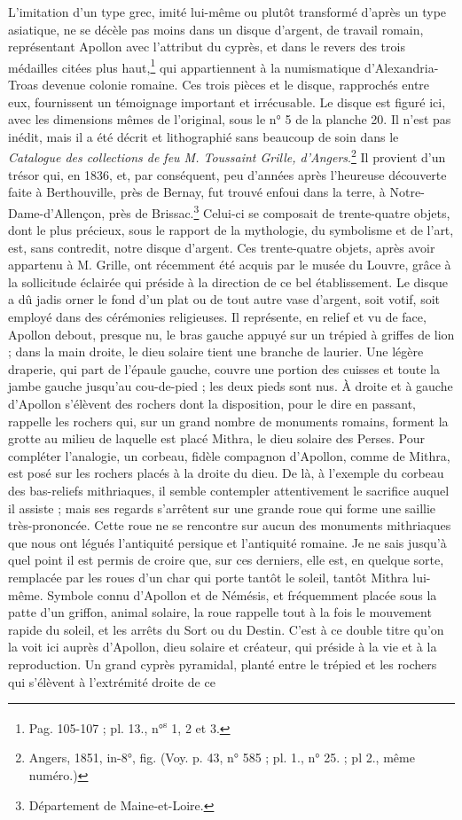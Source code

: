\documentclass{article}
\begin{document}
L'imitation d'un type grec, imité lui-même ou plutôt transformé d'après un type asiatique, ne se décèle pas moins dans un disque d'argent, de travail romain, représentant Apollon avec l'attribut du cyprès, et dans le revers des trois médailles citées plus haut,\footnote{Pag. 105-107 ; pl. 13., n°\textsuperscript{s} 1, 2 et 3.} qui appartiennent à la numismatique d'Alexandria-Troas devenue colonie romaine. Ces trois pièces et le disque, rapprochés entre eux, fournissent un témoignage important et irrécusable. Le disque est figuré ici, avec les dimensions mêmes de l'original, sous le n° 5 de la planche 20. Il n'est pas inédit, mais il a été décrit et lithographié sans beaucoup de soin dans le \emph{Catalogue des collections de feu M. Toussaint Grille, d'Angers}.\footnote{Angers, 1851, in-8°, fig. (Voy. p. 43, n° 585 ; pl. 1., n° 25. ; pl 2., même numéro.)} Il provient d'un trésor qui, en 1836, et, par conséquent, peu d'années après l'heureuse découverte faite à Berthouville, près de Bernay, fut trouvé enfoui dans la terre, à Notre-Dame-d'Allençon, près de Brissac.\footnote{Département de Maine-et-Loire.} Celui-ci se composait de trente-quatre objets, dont le plus précieux, sous le rapport de la mythologie, du symbolisme et de l'art, est, sans contredit, notre disque d'argent. Ces trente-quatre objets, après avoir appartenu à M. Grille, ont récemment été acquis par le musée du Louvre, grâce à la sollicitude éclairée qui préside à la direction de ce bel établissement. Le disque a dû jadis orner le fond d'un plat ou de tout autre vase d'argent, soit votif, soit employé dans des cérémonies religieuses. Il représente, en relief et vu de face, Apollon debout, presque nu, le bras gauche appuyé sur un trépied à griffes de lion ; dans la main droite, le dieu solaire tient une branche de laurier. Une légère draperie, qui part de l'épaule gauche, couvre une portion des cuisses et toute la jambe gauche jusqu'au cou-de-pied ; les deux pieds sont nus. À droite et à gauche d'Apollon s'élèvent des rochers dont la disposition, pour le dire en passant, rappelle les rochers qui, sur un grand nombre de monuments romains, forment la grotte au milieu de laquelle est placé Mithra, le dieu solaire des Perses. Pour compléter l'analogie, un corbeau, fidèle compagnon d'Apollon, comme de Mithra, est posé sur les rochers placés à la droite du dieu. De là, à l'exemple du corbeau des bas-reliefs mithriaques, il semble contempler attentivement le sacrifice auquel il assiste ; mais ses regards s'arrêtent sur une grande roue qui forme une saillie très-prononcée. Cette roue ne se rencontre sur aucun des monuments mithriaques que nous ont légués l'antiquité persique et l'antiquité romaine. Je ne sais jusqu'à quel point il est permis de croire que, sur ces derniers, elle est, en quelque sorte, remplacée par les roues d'un char qui porte tantôt le soleil, tantôt Mithra lui-même. Symbole connu d'Apollon et de Némésis, et fréquemment placée sous la patte d'un griffon, animal solaire, la roue rappelle tout à la fois le mouvement rapide du soleil, et les arrêts du Sort ou du Destin. C'est à ce double titre qu'on la voit ici auprès d'Apollon, dieu solaire et créateur, qui préside à la vie et à la reproduction. Un grand cyprès pyramidal, planté entre le trépied et les rochers qui s'élèvent à l'extrémité droite de ce 
\end{document}
